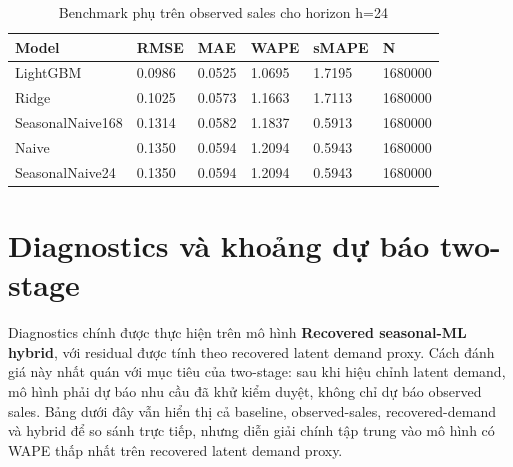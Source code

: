 \documentclass[12pt,a4paper]{article}
\begin{document}
\begin{table}[H]
\centering
\caption{Benchmark phụ trên observed sales cho horizon h=24}
\begin{tabular}{llllll}
\toprule
Model & RMSE & MAE & WAPE & sMAPE & N \\
\midrule
LightGBM & 0.0986 & 0.0525 & 1.0695 & 1.7195 & 1680000 \\
Ridge & 0.1025 & 0.0573 & 1.1663 & 1.7113 & 1680000 \\
SeasonalNaive168 & 0.1314 & 0.0582 & 1.1837 & 0.5913 & 1680000 \\
Naive & 0.1350 & 0.0594 & 1.2094 & 0.5943 & 1680000 \\
SeasonalNaive24 & 0.1350 & 0.0594 & 1.2094 & 0.5943 & 1680000 \\
\bottomrule
\end{tabular}
\end{table}

\section{Diagnostics và khoảng dự báo two-stage}
Diagnostics chính được thực hiện trên mô hình \textbf{Recovered seasonal-ML hybrid}, với residual được tính theo recovered latent demand proxy.
Cách đánh giá này nhất quán với mục tiêu của two-stage: sau khi hiệu chỉnh latent demand, mô hình phải dự báo nhu cầu đã khử kiểm duyệt, không chỉ dự báo observed sales.
Bảng dưới đây vẫn hiển thị cả baseline, observed-sales, recovered-demand và hybrid để so sánh trực tiếp, nhưng diễn giải chính tập trung vào mô hình có WAPE thấp nhất trên recovered latent demand proxy.
\end{document}
